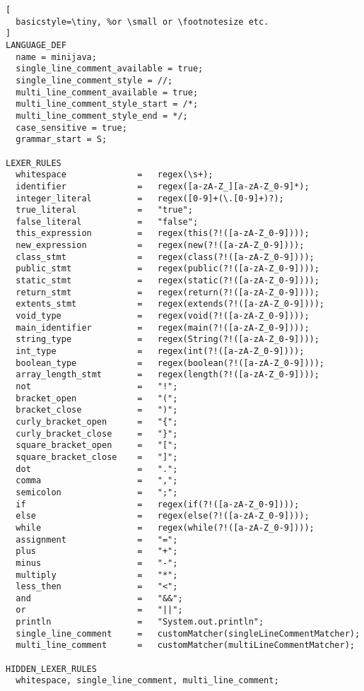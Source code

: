 \begin{lstlisting}[
  basicstyle=\tiny, %or \small or \footnotesize etc.
]
LANGUAGE_DEF
  name = minijava;
  single_line_comment_available = true;
  single_line_comment_style = //;
  multi_line_comment_available = true;
  multi_line_comment_style_start = /*;
  multi_line_comment_style_end = */;
  case_sensitive = true;
  grammar_start = S;

LEXER_RULES
  whitespace              =   regex(\s+);
  identifier              =   regex([a-zA-Z_][a-zA-Z_0-9]*);
  integer_literal         =   regex([0-9]+(\.[0-9]+)?);
  true_literal            =   "true";
  false_literal           =   "false";
  this_expression         =   regex(this(?!([a-zA-Z_0-9])));
  new_expression          =   regex(new(?!([a-zA-Z_0-9])));
  class_stmt              =   regex(class(?!([a-zA-Z_0-9])));
  public_stmt             =   regex(public(?!([a-zA-Z_0-9])));
  static_stmt             =   regex(static(?!([a-zA-Z_0-9])));
  return_stmt             =   regex(return(?!([a-zA-Z_0-9])));
  extents_stmt            =   regex(extends(?!([a-zA-Z_0-9])));
  void_type               =   regex(void(?!([a-zA-Z_0-9])));
  main_identifier         =   regex(main(?!([a-zA-Z_0-9])));
  string_type             =   regex(String(?!([a-zA-Z_0-9])));
  int_type                =   regex(int(?!([a-zA-Z_0-9])));
  boolean_type            =   regex(boolean(?!([a-zA-Z_0-9])));
  array_length_stmt       =   regex(length(?!([a-zA-Z_0-9])));
  not                     =   "!";
  bracket_open            =   "(";
  bracket_close           =   ")";
  curly_bracket_open      =   "{";
  curly_bracket_close     =   "}";
  square_bracket_open     =   "[";
  square_bracket_close    =   "]";
  dot                     =   ".";
  comma                   =   ",";
  semicolon               =   ";";
  if                      =   regex(if(?!([a-zA-Z_0-9])));
  else                    =   regex(else(?!([a-zA-Z_0-9])));
  while                   =   regex(while(?!([a-zA-Z_0-9])));
  assignment              =   "=";
  plus                    =   "+";
  minus                   =   "-";
  multiply                =   "*";
  less_then               =   "<";
  and                     =   "&&";
  or                      =   "||";
  println                 =   "System.out.println";
  single_line_comment     =   customMatcher(singleLineCommentMatcher);
  multi_line_comment      =   customMatcher(multiLineCommentMatcher);

HIDDEN_LEXER_RULES
  whitespace, single_line_comment, multi_line_comment;


\end{lstlisting}
